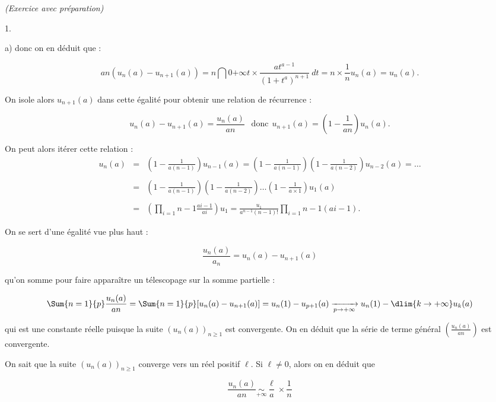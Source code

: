 \documentclass[11pt]{article}%
\begin{document}
\begin{exercice}{\it (Exercice avec préparation)}
\begin{noliste}{1.}
\begin{noliste}{a)}
 donc on en déduit que : 
 
\[
 a n ( u_{n} (a) - u_{n + 1} (a) ) = n \dint{0}{+ \infty} t \times
\frac{ a t^{ a-1 } }{ ( 1 + t^{a} )^{ n + 1 } } \ dt = n \times \frac{
1 }{ n } u_{n} (a) = u_{n} (a). 
\]

 On isole alors $u_{n + 1} (a)$ dans cette égalité pour obtenir une
relation de récurrence : 
 
\[
 u_{n} (a) - u_{n + 1} (a) = \frac{ u_{n} (a ) }{ a n } \ \ \text{ donc
} \ \ u_{n + 1} (a) = \left( 1 - \frac{ 1 }{ a n } \right) u_{n} (a). 
\]

 On peut alors itérer cette relation : 
 \begin{eqnarray*}
 u_{n} (a) & = & \left( 1 - \frac{ 1 }{ a (n-1) } \right) u_{n-1} (a) =
\left( 1 - \frac{ 1 }{ a (n-1) } \right) \left( 1 - \frac{ 1 }{ a (n-2)
} \right) u_{n-2} (a) = \dots \\
\\
 & = & \left( 1 - \frac{ 1 }{ a (n-1) } \right) \left( 1 - \frac{ 1 }{
a (n-2) } \right) \dots \left( 1 - \frac{ 1 }{ a \times 1 } \right)
u_{1} (a) \\
\\
 & = & \left( \prod\limits_{i = 1}{n-1} \frac{ a i - 1 }{ a i } \right)
u_{1} = \frac{ u_{1} }{ a^{n-1} (n-1)! } \prod\limits_{i = 1}{n-1} (a i
- 1 ). \end{eqnarray*}

 \item On se sert d'une égalité vue plus haut : 
 
\[
 \frac{ u_{n} (a) }{ a_{n} } = u_{n} (a) - u_{n + 1} (a) 
\]

 qu'on somme pour faire apparaître un télescopage sur la somme
partielle : 
 
\[
 \Sum{n = 1}{p} \frac{ u_{n} (a) }{ a n } = \Sum{n = 1}{p} [ u_{n} (a)
- u_{n + 1} (a) ] = u_{n} (1) - u_{p + 1} (a) \xrightarrow[ p
\rightarrow + \infty ]{} u_{n} (1 ) - \dlim{ k \rightarrow + \infty }
u_{k} (a) 
\]

 qui est une constante réelle puisque la suite $(u_{n}(a) )_{ n \geq
1}$ est convergente. On en déduit que la série de terme général $
\left( \frac{ u_{n} (a) }{ a n } \right) $ est convergente. \\

 \item On sait que la suite $(u_{n} (a))_{ n \geq 1 }$ converge vers un
réel positif $\ell$. Si $\ell \neq 0$, alors on en déduit que
 
\[
 \frac{ u_{n} (a) }{ a n } \underset{ + \infty }{ \sim } \frac{ \ell }{
a } \times \frac{ 1 }{ n } 
\]


\end{noliste}
\end{noliste}
\end{exercice}
\end{document}
